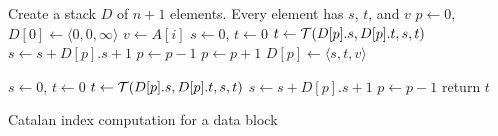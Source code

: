 \begin{algorithm}
\SetAlgoNoLine
{}
Create a stack $D$ of $n+1$ elements.  Every element has $s$, $t$, and $v$ \;
$p \gets 0$, $D[0] \gets \langle 0,0,\infty \rangle$ \;
 {
  $v \gets A[i]$ \; $s \gets 0$, $t \gets 0$ \;
   {
    $t \gets {\cal T}(D[p].s, D[p].t, s, t)$ \;
    $s \gets s + D[p].s + 1$ \;
    $p \gets p - 1$ \;
  }
  $p \gets p + 1$ \;
  $D[p] \gets \langle s,t,{v}\rangle$ \;
}

$s \gets 0$, $t \gets 0$ \;
 {
  $t \gets {\cal T}(D[p].s, D[p].t, s, t)$ \;
  $s \gets s + D[p].s + 1$ \;
  $p \gets p - 1$ \;
}
return $t$ \;

\caption{Catalan index computation for a data block}
\label{alg:cartesian-encode-offline}
\end{algorithm}
